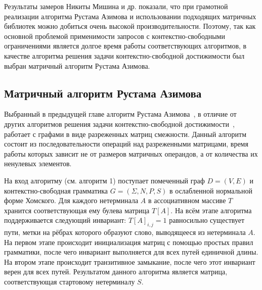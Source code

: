 \documentclass[14pt]{matmex-diploma-custom}
\begin{document}
Результаты замеров Никиты Мишина и др. показали, что при грамотной реализации алгоритма Рустама Азимова и использовании подходящих матричных библиотек можно добиться очень высокой производительности. Поэтому, так как основной проблемой применимости запросов с контекстно-свободными ограничениями является долгое время работы соответствующих алгоритмов, в качестве алгоритма решения задачи конте\-кстно-свободной достижимости был выбран матричный алгоритм Рустама Азимова.

\subsection{Матричный алгоритм Рустама Азимова}\label{sec:matrix-algo}
Выбранный в предыдущей главе алгоритм Рустама Азимова~\cite{Azimov:2018:CPQ:3210259.3210264}, в отличие от других алгоритмов решения задачи контекстно-свободной достижимости~\cite{hellings-2015, santos-2018, zhlang-2016}, работает с графами в виде разреженных матриц смежности. Данный алгоритм состоит из последовательности операций над разреженными матрицами, время работы которых зависит не от размеров матричных операндов, а от количества их ненулевых элементов.

На вход алгоритму (см. алгоритм 1) поступает помеченный граф $D=(V,E)$ и контекстно-свободная грамматика $G=(\Sigma, N, P, S)$ в ослабленной нормальной форме Хомского. Для каждого нетерминала $A$ в ассоциативном массиве $T$ хранится соответствующая ему булева матрица $T[A]$. На всём этапе алгоритма поддерживается следующий инвариант: $T[A]_{i,j} = 1$ равносильно существует пути, метки на рёбрах которого образуют слово, выводящееся из нетерминала $A$. На первом этапе происходит инициализация матриц с помощью простых правил грамматики, после чего инвариант выполняется для всех путей единичной длины. На втором этапе происходит транзитивное замыкание, после чего этот инвариант верен для всех путей. Результатом данного алгоритма является матрица, соответствующая стартовому нетерминалу $S$.

\end{document}
